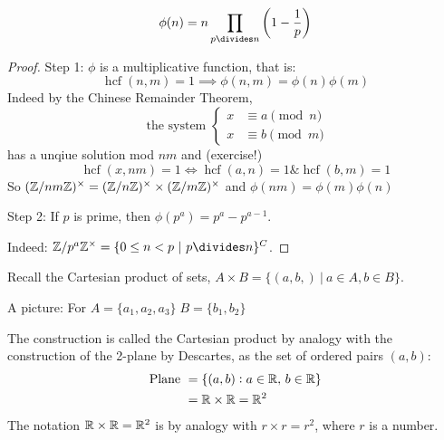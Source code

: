 \documentclass[twoside]{scrartcl}
\DeclareMathOperator{\hcf}{hcf}
\begin{document}
\begin{proposition}
\[\phi(n) = n\prod_{p \divides n} \left(1-\frac{1}{p}\right)\]	
\end{proposition}
\begin{proof}

Step 1: $\phi$ is a multiplicative function, that is: 
	\[\hcf(n,m) = 1 \implies \phi(n,m) = \phi(n)\phi(m)\]
	Indeed by the Chinese Remainder Theorem, 
	\[\text{ the system } \begin{cases}
 	x&\equiv a \pmod{n}\\
 	x&\equiv b \pmod{m}
 \end{cases}
\]
has a unqiue solution mod $nm$ and (exercise!) \[\hcf(x,nm) = 1\iff \hcf(a,n) = 1 \& \hcf(b,m)=1\]
So $(\mathbb{Z} / nm\mathbb{Z})^{\times} = (\mathbb{Z}/n\mathbb{Z})^\times \times (\mathbb{Z} / m\mathbb{Z})^\times$ and $\phi(nm) = \phi(m)\phi(n)$

Step 2: If $p$ is prime, then $\phi(p^a) = p^a - p^{a-1}$. 

Indeed: $\Z / p^a\Z ^\times = \{0 \leq n < p ~|~ p \divides n\}^C$. 
\end{proof}









Recall the Cartesian product of sets, $A \times B = \{(a,b,) ~|~ a \in A, b \in B\}$. 

A picture: For $A = \{a_1,a_2,a_3\}\; B = \{b_1,b_2\}$

\begin{center}
	
\end{center}
The construction is called the Cartesian product by analogy with the construction of the 2-plane by Descartes, as the set of ordered pairs $(a,b)$:
\[
\begin{aligned}
  \text{Plane } &= \{(a,b) : a \in\mathbb{R},\, b\in\mathbb{R}\}\\
  &= \mathbb{R} \times \mathbb{R} = \mathbb{R}^2
\end{aligned}
\]
The notation $\mathbb{R} \times \mathbb{R} = \mathbb{R}^2$ is by analogy with $r \times r = r^2$, where $r$ is a number.\\
\end{document}
